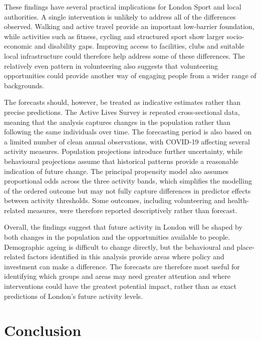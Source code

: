 \documentclass[ %
                    author={Ashrey Ashrey, Sanya Kapoor, Trisha Sharma, Yash Bhooshan Pandloskar},
                supervisor={Dr. Dalila O’Grady},
                    degree={MSc},
                     title={Using machine learning to forecast physical activity participation, volunteering and activity patterns in London},
                  subtitle={},
                      type={},
                      year={2021}]{dissertation}
\begin{document}
These findings have several practical implications for London Sport and local authorities. A single intervention is unlikely to address all of the differences observed. Walking and active travel provide an important low-barrier foundation, while activities such as fitness, cycling and structured sport show larger socio-economic and disability gaps. Improving access to facilities, clubs and suitable local infrastructure could therefore help address some of these differences. The relatively even pattern in volunteering also suggests that volunteering opportunities could provide another way of engaging people from a wider range of backgrounds.

The forecasts should, however, be treated as indicative estimates rather than precise predictions. The Active Lives Survey is repeated cross-sectional data, meaning that the analysis captures changes in the population rather than following the same individuals over time. The forecasting period is also based on a limited number of clean annual observations, with COVID-19 affecting several activity measures. Population projections introduce further uncertainty, while behavioural projections assume that historical patterns provide a reasonable indication of future change. The principal propensity model also assumes proportional odds across the three activity bands, which simplifies the modelling of the ordered outcome but may not fully capture differences in predictor effects between activity thresholds. Some outcomes, including volunteering and health-related measures, were therefore reported descriptively rather than forecast.

Overall, the findings suggest that future activity in London will be shaped by both changes in the population and the opportunities available to people. Demographic ageing is difficult to change directly, but the behavioural and place-related factors identified in this analysis provide areas where policy and investment can make a difference. The forecasts are therefore most useful for identifying which groups and areas may need greater attention and where interventions could have the greatest potential impact, rather than as exact predictions of London's future activity levels.




\chapter{Conclusion}
\label{chap:conclusion}
\end{document}
